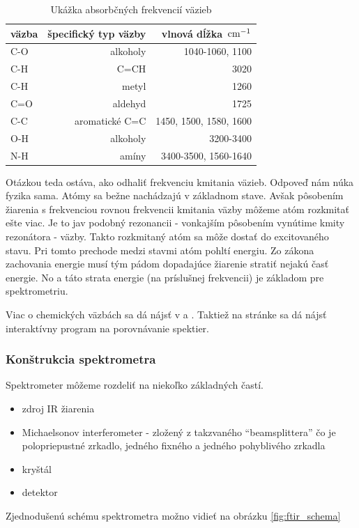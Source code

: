 \begin{table}[htb]
    \centering
    \begin{tabular}{| l | r | r |}
        \hline
        väzba & špecifický typ väzby & vlnová dĺžka $\,\mbox{cm}^{-1}$ \\ \hline
        C-O & alkoholy & 1040-1060, 1100 \\ \hline
        C-H & C=CH & 3020 \\ \hline
        C-H & metyl & 1260 \\ \hline
        C=O & aldehyd & 1725 \\ \hline
        C-C & aromatické C=C & 1450, 1500, 1580, 1600 \\ \hline
        O-H & alkoholy & 3200-3400 \\ \hline
        N-H & amíny & 3400-3500, 1560-1640 \\ \hline
    \end{tabular}
    \caption{Ukážka absorbčných frekvencií väzieb}\label{tab:vazby}
\end{table}

Otázkou teda ostáva, ako odhaliť frekvenciu kmitania väzieb. Odpoveď
nám núka fyzika sama. Atómy sa bežne nachádzajú v základnom stave.
Avšak pôsobením žiarenia s frekvenciou rovnou frekvencii kmitania
väzby môžeme atóm rozkmitať ešte viac. Je to jav podobný rezonancii - 
vonkajším pôsobením vynútime kmity rezonátora - väzby.
Takto rozkmitaný atóm sa môže dostať do excitovaného stavu. Pri tomto
prechode medzi stavmi atóm pohltí energiu. Zo zákona zachovania
energie musí tým pádom dopadajúce žiarenie stratiť nejakú časť
energie. No a táto strata energie (na príslušnej frekvencii) je
základom pre spektrometriu.


\begin{poznamka}
    Viac o chemických väzbách sa dá nájsť v \cite{wiki:bonds} a
    \cite{Chem}. Taktiež na stránke \cite{webspectra} sa dá nájsť
    interaktívny program na porovnávanie spektier.
\end{poznamka}

\subsubsection{Konštrukcia spektrometra}

Spektrometer môžeme rozdeliť na niekoľko základných častí.
\begin{itemize}
    \item zdroj IR žiarenia 
    \item Michaelsonov interferometer - zložený z takzvaného
    ``beamsplittera'' čo je polopriepustné zrkadlo, jedného fixného
    a jedného pohyblivého zrkadla
    \item kryštál
    \item detektor
\end{itemize}
Zjednodušenú schému spektrometra možno vidieť na obrázku
\ref{fig:ftir_schema}

